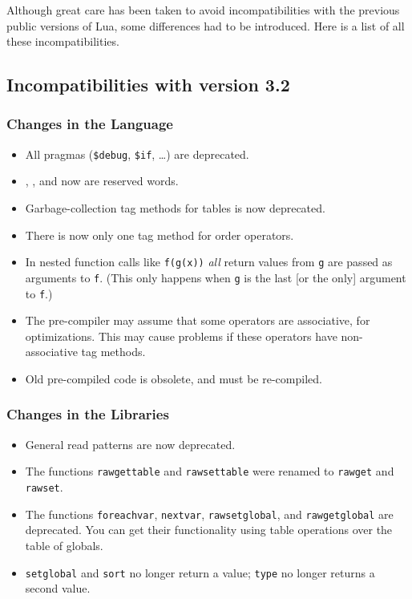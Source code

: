 \documentclass[11pt]{article}
\newcommand{\Index}[1]{#1\index{#1}}
\begin{document}
Although great care has been taken to avoid incompatibilities with
the previous public versions of Lua,
some differences had to be introduced.
Here is a list of all these incompatibilities.

\subsection*{Incompatibilities with \Index{version 3.2}}

\subsubsection*{Changes in the Language}
\begin{itemize}

\item
All pragmas (\verb|$debug|, \verb|$if|, \ldots) are deprecated.

\item {}, , and  now are reserved words.

\item
Garbage-collection tag methods for tables is now deprecated.

\item
There is now only one tag method for order operators.

\item
In nested function calls like \verb|f(g(x))|
\emph{all} return values from \verb|g| are passed as arguments to \verb|f|.
(This only happens when \verb|g| is the last
[or the only] argument to \verb|f|.)

\item
The pre-compiler may assume that some operators are associative,
for optimizations.
This may cause problems if these operators
have non-associative tag methods.

\item Old pre-compiled code is obsolete, and must be re-compiled.

\end{itemize}


\subsubsection*{Changes in the Libraries}
\begin{itemize}

\item
General read patterns are now deprecated.

\item
The functions \verb|rawgettable| and \verb|rawsettable|
were renamed to \verb|rawget| and \verb|rawset|.

\item
The functions \verb|foreachvar|, \verb|nextvar|,
\verb|rawsetglobal|, and \verb|rawgetglobal| are deprecated.
You can get their functionality using table operations 
over the table of globals.

\item
\verb|setglobal| and \verb|sort| no longer return a value;
\verb|type| no longer returns a second value.

\end{itemize}
\end{document}
